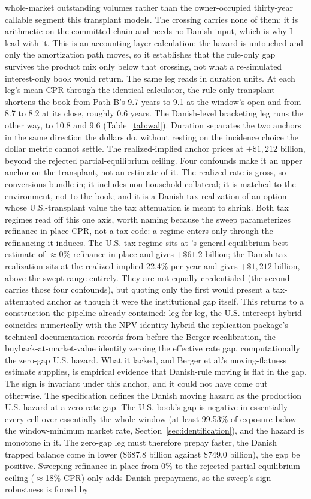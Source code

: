 \documentclass[12pt]{article}
\begin{document}
whole-market outstanding volumes rather than the owner-occupied thirty-year callable segment this transplant models. The crossing carries none of them: it is arithmetic on the committed chain and needs no Danish input, which is why I lead with it. This is an accounting-layer calculation: the hazard is untouched and only the amortization path moves, so it establishes that the rule-only gap survives the product mix only below that crossing, not what a re-simulated interest-only book would return. The same leg reads in duration units. At each leg's mean CPR through the identical calculator, the rule-only transplant shortens the book from Path B's 9.7 years to 9.1 at the window's open and from 8.7 to 8.2 at its close, roughly 0.6 years. The Danish-level bracketing leg runs the other way, to 10.8 and 9.6 (Table~\ref{tab:wal}). Duration separates the two anchors in the same direction the dollars do, without resting on the incidence choice the dollar metric cannot settle. The realized-implied anchor prices at $+\$1{,}212$ billion, beyond the rejected partial-equilibrium ceiling. Four confounds make it an upper anchor on the transplant, not an estimate of it. The realized rate is gross, so conversions bundle in; it includes non-household collateral; it is matched to the environment, not to the book; and it is a Danish-tax realization of an option whose U.S.-transplant value the tax attenuation is meant to shrink. Both tax regimes read off this one axis, worth naming because the sweep parameterizes refinance-in-place CPR, not a tax code: a regime enters only through the refinancing it induces. The U.S.-tax regime sits at \citeauthor{berger2026}'s general-equilibrium best estimate of $\approx$0\% refinance-in-place and gives $+\$61.2$ billion; the Danish-tax realization sits at the realized-implied 22.4\% per year and gives $+\$1{,}212$ billion, above the swept range entirely. They are not equally credentialed (the second carries those four confounds), but quoting only the first would present a tax-attenuated anchor as though it were the institutional gap itself. This returns to a construction the pipeline already contained: leg for leg, the U.S.-intercept hybrid coincides numerically with the NPV-identity hybrid the replication package's technical documentation records from before the Berger recalibration, the buyback-at-market-value identity zeroing the effective rate gap, computationally the zero-gap U.S. hazard. What it lacked, and Berger et al.'s moving-flatness estimate supplies, is empirical evidence that Danish-rule moving is flat in the gap. The sign is invariant under this anchor, and it could not have come out otherwise. The specification defines the Danish moving hazard as the production U.S. hazard at a zero rate gap. The U.S. book's gap is negative in essentially every cell over essentially the whole window (at least 99.53\% of exposure below the window-minimum market rate, Section~\ref{sec:identification}), and the hazard is monotone in it. The zero-gap leg must therefore prepay faster, the Danish trapped balance come in lower (\$687.8 billion against \$749.0 billion), the gap be positive. Sweeping refinance-in-place from 0\% to the rejected partial-equilibrium ceiling ($\approx$18\% CPR) only adds Danish prepayment, so the sweep's sign-robustness is forced by 
\end{document}

